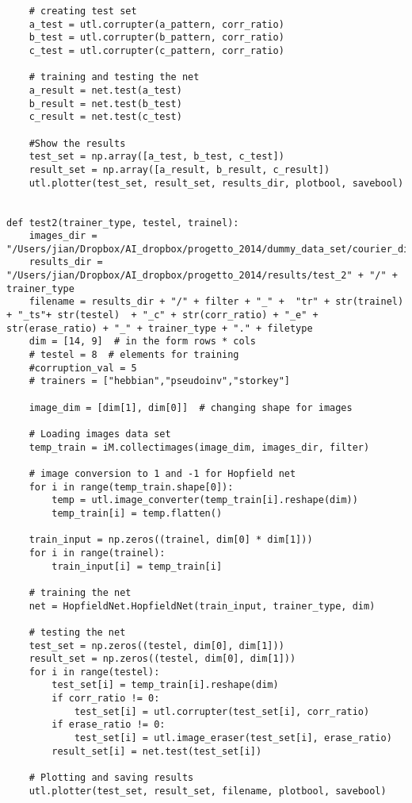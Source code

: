 \documentclass[letterpaper,twocolumn,10pt]{article}
\begin{document}
\begin{lstlisting}
    # creating test set
    a_test = utl.corrupter(a_pattern, corr_ratio)
    b_test = utl.corrupter(b_pattern, corr_ratio)
    c_test = utl.corrupter(c_pattern, corr_ratio)

    # training and testing the net
    a_result = net.test(a_test)
    b_result = net.test(b_test)
    c_result = net.test(c_test)

    #Show the results
    test_set = np.array([a_test, b_test, c_test])
    result_set = np.array([a_result, b_result, c_result])
    utl.plotter(test_set, result_set, results_dir, plotbool, savebool)


def test2(trainer_type, testel, trainel):
    images_dir = "/Users/jian/Dropbox/AI_dropbox/progetto_2014/dummy_data_set/courier_digits_data_set/tiff_images_swidth"
    results_dir = "/Users/jian/Dropbox/AI_dropbox/progetto_2014/results/test_2" + "/" + trainer_type
    filename = results_dir + "/" + filter + "_" +  "tr" + str(trainel) + "_ts"+ str(testel)  + "_c" + str(corr_ratio) + "_e" + str(erase_ratio) + "_" + trainer_type + "." + filetype
    dim = [14, 9]  # in the form rows * cols
    # testel = 8  # elements for training
    #corruption_val = 5
    # trainers = ["hebbian","pseudoinv","storkey"]

    image_dim = [dim[1], dim[0]]  # changing shape for images

    # Loading images data set
    temp_train = iM.collectimages(image_dim, images_dir, filter)

    # image conversion to 1 and -1 for Hopfield net
    for i in range(temp_train.shape[0]):
        temp = utl.image_converter(temp_train[i].reshape(dim))
        temp_train[i] = temp.flatten()

    train_input = np.zeros((trainel, dim[0] * dim[1]))
    for i in range(trainel):
        train_input[i] = temp_train[i]

    # training the net
    net = HopfieldNet.HopfieldNet(train_input, trainer_type, dim)

    # testing the net
    test_set = np.zeros((testel, dim[0], dim[1]))
    result_set = np.zeros((testel, dim[0], dim[1]))
    for i in range(testel):
        test_set[i] = temp_train[i].reshape(dim)
        if corr_ratio != 0:
            test_set[i] = utl.corrupter(test_set[i], corr_ratio)
        if erase_ratio != 0:
            test_set[i] = utl.image_eraser(test_set[i], erase_ratio)
        result_set[i] = net.test(test_set[i])

    # Plotting and saving results
    utl.plotter(test_set, result_set, filename, plotbool, savebool)



\end{lstlisting}
\end{document}
